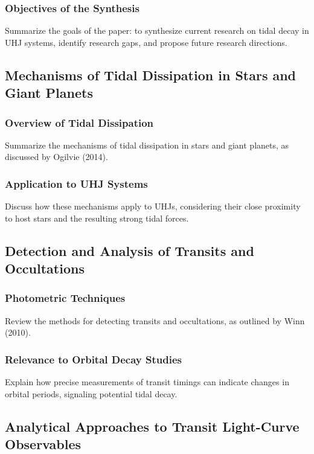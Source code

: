 \documentclass[oneside,12pt]{amsart}
\numberwithin{page}{section}
\begin{document}
\subsubsection{Objectives of the Synthesis}
Summarize the goals of the paper: to synthesize current research on tidal decay in UHJ systems, identify research gaps, and propose future research directions.


\subsection{Mechanisms of Tidal Dissipation in Stars and Giant Planets}\label{sec:tidaldissipation}

\subsubsection{Overview of Tidal Dissipation}
Summarize the mechanisms of tidal dissipation in stars and giant planets, as discussed by Ogilvie (2014).

\subsubsection{Application to UHJ Systems}
Discuss how these mechanisms apply to UHJs, considering their close proximity to host stars and the resulting strong tidal forces.


\subsection{Detection and Analysis of Transits and Occultations}

\subsubsection{Photometric Techniques}
Review the methods for detecting transits and occultations, as outlined by Winn (2010).

\subsubsection{Relevance to Orbital Decay Studies}
Explain how precise measurements of transit timings can indicate changes in orbital periods, signaling potential tidal decay.


\subsection{Analytical Approaches to Transit Light-Curve Observables}
\end{document}
